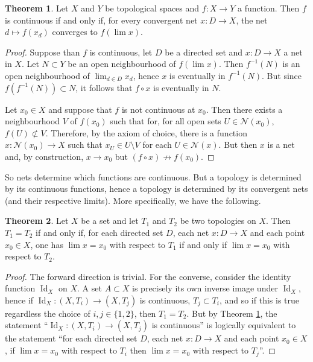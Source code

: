 \documentclass{book}
\theoremstyle{definition}
\newtheorem{theorem}{Theorem}[section]
\theoremstyle{remark}
\DeclareMathOperator{\Id}{Id}
\newcommand{\neigh}[1]{\mathcal N(#1)}
\begin{document}
\begin{theorem}\label{nets determine continuity}
Let $X$ and $Y$ be topological spaces and $f:X\to Y$ a function. Then $f$ is continuous if and only if, for every convergent net $x:D\to X$, the net $d\mapsto f(x_d)$ converges to $f(\lim x)$.
\end{theorem}
\begin{proof}
Suppose than $f$ is continuous, let $D$ be a directed set and $x:D\to X$ a net in $X$. Let $N\subset Y$ be an open neighbourhood of $f(\lim x)$. Then $f^{-1}(N)$ is an open neighbourhood of $\lim_{d\in D}x_d$, hence $x$ is eventually in $f^{-1}(N)$. But since $f(f^{-1}(N))\subset N$, it follows that $f\circ x$ is eventually in $N$.

Let $x_0\in X$ and suppose that $f$ is not continuous at $x_0$. Then there exists a neighbourhood $V$ of $f(x_0)$ such that for, for all open sets $U\in \neigh{x_0}$, $f(U)\not\subset V$. Therefore, by the axiom of choice, there is a function $x:\neigh{x_0}\to X$ such that $x_U\in U\setminus V$ for each $U\in\neigh{x}$. But then $x$ is a net and, by construction, $x\to x_0$ but $(f\circ x)\not\to f(x_0)$.
\end{proof}

So nets determine which functions are continuous. But a topology is determined by its continuous functions, hence a topology is determined by its convergent nets (and their respective limits). More specifically, we have the following.

\begin{theorem}
    Let $X$ be a set and let $T_1$ and $T_2$ be two topologies on $X$. Then $T_1=T_2$ if and only if, for each directed set $D$, each net $x:D\to X$ and each point $x_0\in X$, one has $\lim x=x_0$ with respect to $T_1$ if and only if $\lim x=x_0$ with respect to $T_2$.
\end{theorem}
\begin{proof}
    The forward direction is trivial. For the converse, consider the identity function $\Id_X$ on $X$. A set $A\subset X$ is precisely its own inverse image under $\Id_X$, hence if $\Id_X:(X,T_i)\to (X,T_j)$ is continuous, $T_j\subset T_i$, and so if this is true regardless the choice of $i,j\in\{1,2\}$, then $T_1=T_2$. But by Theorem \ref{nets determine continuity}, the statement ``$\Id_X:(X,T_i)\to (X,T_j)$ is continuous'' is logically equivalent to the statement ``for each directed set $D$, each net $x:D\to X$ and each point $x_0\in X$, if $\lim x=x_0$ with respect to $T_i$ then $\lim x=x_0$ with respect to $T_j$''. 
\end{proof}
\end{document}
